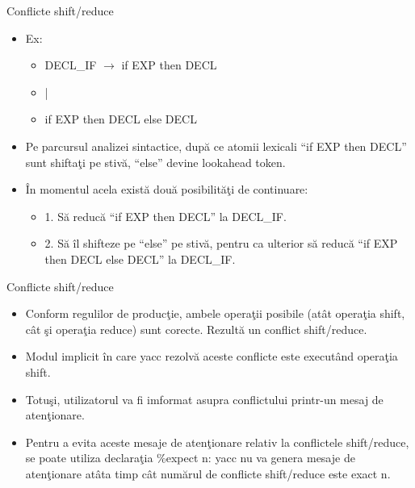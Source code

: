 \documentclass[pdf]{beamer}
\begin{document}
\begin{frame}{Conflicte shift/reduce}
\begin{itemize}
	\item
	Ex:

	\begin{itemize}
		\item[]
		DECL\_IF  $\rightarrow$  if EXP then DECL

		\item[]
		\hspace{1.95cm} |

		\item[]
		\hspace{1.95cm} if EXP then DECL else DECL

	\end{itemize}	

	\item
	Pe parcursul analizei sintactice, după ce atomii lexicali “if EXP then DECL” sunt shiftaţi pe stivă, “else” devine lookahead token.

	\item
	În momentul acela există două posibilităţi de continuare: 

	\begin{itemize}
		\item[]
		1. Să reducă “if EXP then DECL” la DECL\_IF.

		\item[]
		2. Să îl shifteze pe “else” pe stivă, pentru ca ulterior să reducă “if EXP then DECL else DECL” la DECL\_IF.

	\end{itemize}

\end{itemize}
\end{frame}



\begin{frame}{Conflicte shift/reduce}
\begin{itemize}
	\item
	Conform regulilor de producţie, ambele operaţii posibile (atât operaţia shift, cât şi operaţia reduce) sunt corecte. Rezultă {\color{red}un conflict shift/reduce}.

	\item
	Modul implicit în care yacc rezolvă aceste conflicte este executând operaţia shift.

	\item
	Totuşi, utilizatorul va fi imformat asupra conflictului printr-un mesaj de atenţionare.

	\item
	Pentru a evita aceste mesaje de atenţionare relativ la conflictele shift/reduce, se poate utiliza declaraţia {\color{red}\%expect n}: yacc nu va genera mesaje de atenţionare atâta timp cât numărul de conflicte shift/reduce este exact n.

\end{itemize}
\end{frame}
\end{document}
